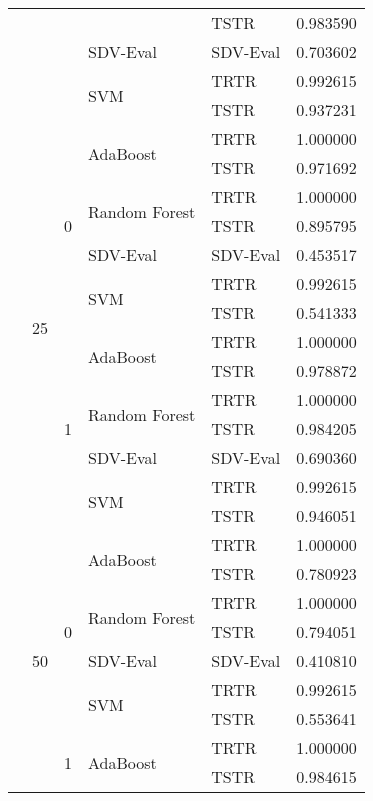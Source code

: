 \begin{longtable}{lllllr}
 &  &  &  & TSTR & 0.983590 \\
\cline{4-6}
 &  &  & SDV-Eval & SDV-Eval & 0.703602 \\
\cline{4-6}
 &  &  & \multirow[t]{2}{*}{SVM} & TRTR & 0.992615 \\
 &  &  &  & TSTR & 0.937231 \\
\cline{2-6} \cline{3-6} \cline{4-6}
 & \multirow[t]{14}{*}{25} & \multirow[t]{7}{*}{0} & \multirow[t]{2}{*}{AdaBoost} & TRTR & 1.000000 \\
 &  &  &  & TSTR & 0.971692 \\
\cline{4-6}
 &  &  & \multirow[t]{2}{*}{Random Forest} & TRTR & 1.000000 \\
 &  &  &  & TSTR & 0.895795 \\
\cline{4-6}
 &  &  & SDV-Eval & SDV-Eval & 0.453517 \\
\cline{4-6}
 &  &  & \multirow[t]{2}{*}{SVM} & TRTR & 0.992615 \\
 &  &  &  & TSTR & 0.541333 \\
\cline{3-6} \cline{4-6}
 &  & \multirow[t]{7}{*}{1} & \multirow[t]{2}{*}{AdaBoost} & TRTR & 1.000000 \\
 &  &  &  & TSTR & 0.978872 \\
\cline{4-6}
 &  &  & \multirow[t]{2}{*}{Random Forest} & TRTR & 1.000000 \\
 &  &  &  & TSTR & 0.984205 \\
\cline{4-6}
 &  &  & SDV-Eval & SDV-Eval & 0.690360 \\
\cline{4-6}
 &  &  & \multirow[t]{2}{*}{SVM} & TRTR & 0.992615 \\
 &  &  &  & TSTR & 0.946051 \\
\cline{2-6} \cline{3-6} \cline{4-6}
 & \multirow[t]{14}{*}{50} & \multirow[t]{7}{*}{0} & \multirow[t]{2}{*}{AdaBoost} & TRTR & 1.000000 \\
 &  &  &  & TSTR & 0.780923 \\
\cline{4-6}
 &  &  & \multirow[t]{2}{*}{Random Forest} & TRTR & 1.000000 \\
 &  &  &  & TSTR & 0.794051 \\
\cline{4-6}
 &  &  & SDV-Eval & SDV-Eval & 0.410810 \\
\cline{4-6}
 &  &  & \multirow[t]{2}{*}{SVM} & TRTR & 0.992615 \\
 &  &  &  & TSTR & 0.553641 \\
\cline{3-6} \cline{4-6}
 &  & \multirow[t]{7}{*}{1} & \multirow[t]{2}{*}{AdaBoost} & TRTR & 1.000000 \\
 &  &  &  & TSTR & 0.984615 \\

\end{longtable}
